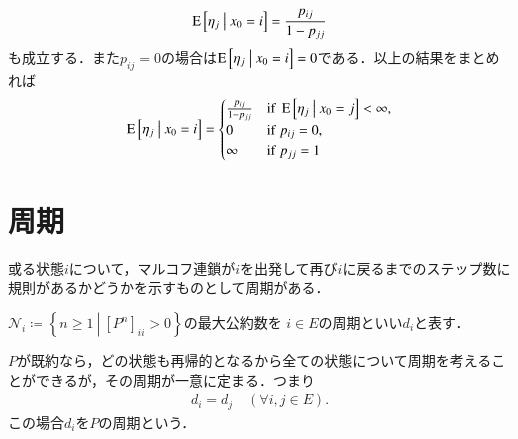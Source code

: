 \begin{prf}
\begin{align}
			\operatorname{E} \left[ \eta_j \ \middle|\ x_0 = i \right] = \frac{p_{ij}}{1 - p_{jj}}
		\end{align}
		も成立する．また$p_{ij} = 0$の場合は$\operatorname{E} \left[ \eta_j \ \middle|\ x_0 = i \right] = 0$である．以上の結果をまとめれば
		\begin{align}
			\cexp{\eta_j}{x_0 = i} = \begin{cases}
				\frac{p_{ij}}{1 - p_{jj}} & {\rm if}\ \cexp{\eta_j}{x_0 = j} < \infty, \\
				0 & {\rm if}\ p_{ij} = 0, \\
				\infty & {\rm if}\ p_{jj} = 1
			\end{cases}
		\end{align}
		\QED
	\end{prf}

\section{周期}
	或る状態$i$について，マルコフ連鎖が$i$を出発して再び$i$に戻るまでのステップ数に規則があるかどうかを示すものとして周期がある．
	\begin{dfn}[状態の周期]
		$\mathcal{N}_i \coloneqq \left\{n \geq 1\ \left|\ [P^n]_{ii} > 0 \right.\right\}$の最大公約数を
		$i \in E$の周期といい$d_i$と表す．
	\end{dfn}
	
	\begin{prp}[既約なら周期は状態に依らない]
		$P$が既約なら，どの状態も再帰的となるから全ての状態について周期を考えることができるが，その周期が一意に定まる．つまり
		\begin{align}
			d_i = d_j \quad (\forall i,j \in E).
		\end{align}
		この場合$d_i$を$P$の周期という．
	\end{prp}
	

